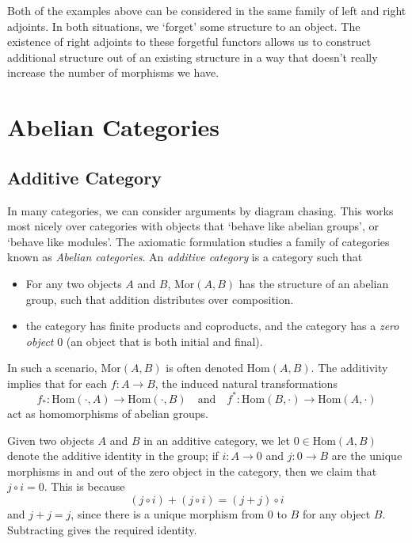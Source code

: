 Both of the examples above can be considered in the same family of left and right adjoints. In both situations, we `forget' some structure to an object. The existence of right adjoints to these forgetful functors allows us to construct additional structure out of an existing structure in a way that doesn't really increase the number of morphisms we have.

\chapter{Abelian Categories}

\section{Additive Category}

In many categories, we can consider arguments by diagram chasing. This works most nicely over categories with objects that `behave like abelian groups', or `behave like modules'. The axiomatic formulation studies a family of categories known as \emph{Abelian categories}. An \emph{additive category} is a category such that
%
\begin{itemize}
    \item For any two objects $A$ and $B$, $\text{Mor}(A,B)$ has the structure of an abelian group, such that addition distributes over composition.

    \item the category has finite products and coproducts, and the category has a \emph{zero object} $0$ (an object that is both initial and final).
\end{itemize}
%
In such a scenario, $\text{Mor}(A,B)$ is often denoted $\text{Hom}(A,B)$. The additivity implies that for each $f: A \to B$, the induced natural transformations
%
\[ f_*: \text{Hom}(\cdot,A) \to \text{Hom}(\cdot,B) \quad\text{and}\quad f^*: \text{Hom}(B,\cdot) \to \text{Hom}(A,\cdot) \]
%
act as homomorphisms of abelian groups.

Given two objects $A$ and $B$ in an additive category, we let $0 \in \text{Hom}(A,B)$ denote the additive identity in the group; if $i: A \to 0$ and $j: 0 \to B$ are the unique morphisms in and out of the zero object in the category, then we claim that $j \circ i = 0$. This is because
%
\[ (j \circ i) + (j \circ i) = (j + j) \circ i \]
%
and $j + j = j$, since there is a unique morphism from $0$ to $B$ for any object $B$. Subtracting gives the required identity.


